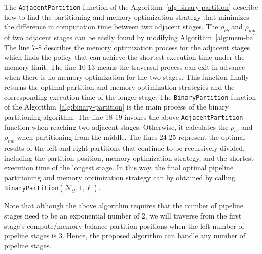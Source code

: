 The \texttt{AdjacentPartition} function of the Algorithm~\ref{alg:binary-partition}
describe how to find the partitioning and memory optimization strategy
that minimizes the difference in computation time between two adjacent stages.
The $\rho_{cb}$ and $\rho_{mb}$ of two adjacent stages
can be easily found by modifying Algorithm~\ref{alg:mem-ba}.
The line 7-8 describes the memory optimization process for the adjacent stages which
finds the policy that can achieve the shortest execution time under the memory limit.
The line 10-13 means the traversal process can exit in advance
when there is no memory optimization for the two stages.
This function finally returns the optimal partition and memory optimization strategies
and the corresponding execution time of the longer stage.
The \texttt{BinaryPartition} function of the Algorithm~\ref{alg:binary-partition}
is the main process of the binary partitioning algorithm.
The line 18-19 invokes the above \texttt{AdjacentPartition} function
when reaching two adjacent stages.
Otherwise, it calculates the $\rho_{cb}$ and $\rho_{mb}$ when partitioning from the middle.
The lines 24-25 represent the optimal results of the left and right partitions that continue to be
recursively divided, including the partition position, memory optimization strategy,
and the shortest execution time of the longest stage.
In this way, the final optimal pipeline partitioning and memory optimization strategy
can by obtained by calling \texttt{BinaryPartition}$(\mathcal{N}_\mathcal{G}, 1, \ell)$.

Note that although the above algorithm requires that the number of pipeline stages
need to be an exponential number of 2,
we will traverse from the first stage's compute/memory-balance partition positions
when the left number of pipeline stages is 3.
Hence, the proposed algorithm can handle any number of pipeline stages.

